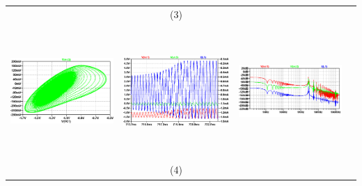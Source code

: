 \documentclass{rbf}
\begin{document}
\begin{table}[h]
\begin{tabular}{c c c c}
        & (3) & \\
        \includegraphics[width=5cm,height=5cm]{R7/1419.44 C0 800m atractor.png}&
        \includegraphics[width=5cm,height=5cm]{R7/1419.44 C0 800m time series.png}&
        \includegraphics[width=5cm,height=5cm]{R7/1419.44 C0 800m fft.png}&\\
        & (4) & \\
        \hline  
    \end{tabular}
\end{table}
\end{document}
